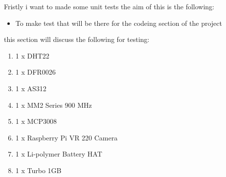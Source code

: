 Fristly i want to made  some unit tests the aim of this  is the  following:
\begin{itemize}
    \item To make  test  that will be  there for  the  codeing  section of  the  project 
\end{itemize}
this section will discuss the  following for  testing:
\begin{enumerate}
    \item 1 x DHT22
    \item 1 x DFR0026
    \item 1 x AS312
    \item 1 x MM2 Series 900 MHz
    \item 1 x MCP3008
    \item 1 x Raspberry Pi VR 220 Camera
    \item  1 x Li-polymer Battery HAT 
    \item 1 x Turbo 1GB 
\end{enumerate}
